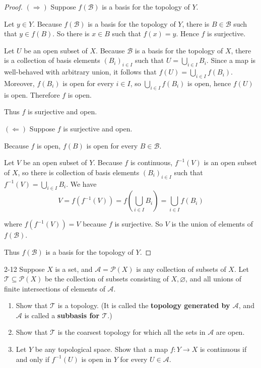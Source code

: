\begin{proof}
	$(\Longrightarrow)$ Suppose $f(\mathscr{B})$ is a basis for the topology of $Y$.

	Let $y\in Y$. Because $f(\mathscr{B})$ is a basis for the topology of $Y$, there is $B\in\mathscr{B}$ such that $y\in f(B)$. So there is $x\in B$ such that $f(x) = y$. Hence $f$ is surjective.

	Let $U$ be an open subset of $X$. Because $\mathscr{B}$ is a basis for the topology of $X$, there is a collection of basis elements ${(B_{i})}_{i\in I}$ such that $U = \bigcup_{i\in I}B_{i}$. Since a map is well-behaved with arbitrary union, it follows that $f(U) = \bigcup_{i\in I}f(B_{i})$. Moreover, $f(B_{i})$  is open for every $i\in I$, so $\bigcup_{i\in I}f(B_{i})$ is open, hence $f(U)$ is open. Therefore $f$ is open.

	Thus $f$ is surjective and open.

	$(\Longleftarrow)$ Suppose $f$ is surjective and open.

	Because $f$ is open, $f(B)$ is open for every $B\in\mathscr{B}$.

	Let $V$ be an open subset of $Y$. Because $f$ is continuous, $f^{-1}(V)$ is an open subset of $X$, so there is collection of basis elements ${(B_{i})}_{i\in I}$ such that $f^{-1}(V) = \bigcup_{i\in I}B_{i}$. We have
	\[
		V = f(f^{-1}(V)) = f\left(\bigcup_{i\in I}B_{i}\right) = \bigcup_{i\in I}f(B_{i})
	\]

	where $f(f^{-1}(V)) = V$ because $f$ is surjective. So $V$ is the union of elements of $f(\mathscr{B})$.

	Thus $f(\mathscr{B})$ is a basis for the topology of $Y$.
\end{proof}

\begin{problem}{2-12}
Suppose $X$ is a set, and $\mathscr{A} = \mathscr{P}(X)$ is any collection of subsets of $X$. Let $\mathscr{T}\subseteq \mathscr{P}(X)$ be the collection of subsets consisting of $X, \varnothing$, and all unions of finite intersections of elements of $\mathscr{A}$.
\begin{enumerate}[label={(\alph*)}]
	\item Show that $\mathscr{T}$ is a topology. (It is called the \textbf{topology generated by $\mathscr{A}$}, and $\mathscr{A}$ is called a \textbf{subbasis for $\mathscr{T}$}.)
	\item Show that $\mathscr{T}$ is the coarsest topology for which all the sets in $\mathscr{A}$ are open.
	\item Let $Y$ be any topological space. Show that a map $f: Y\to X$ is continuous if and only if $f^{-1}(U)$ is open in $Y$ for every $U\in\mathscr{A}$.
\end{enumerate}
\end{problem}

